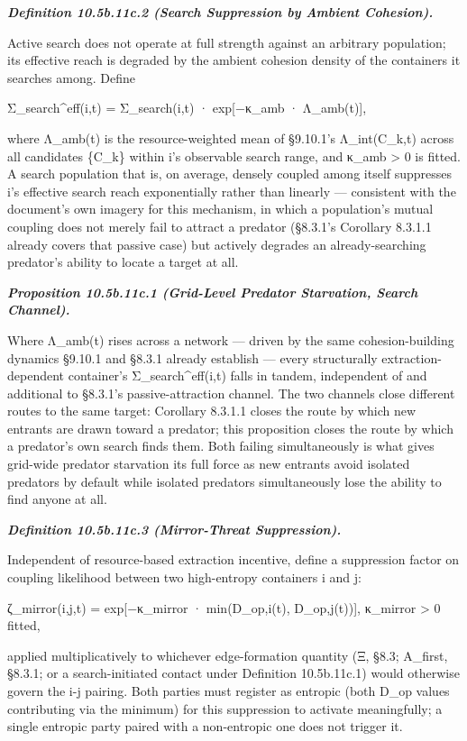 \documentclass[
]{article}
\begin{document}
\emph{\textbf{Definition 10.5b.11c.2 (Search Suppression by Ambient
Cohesion).}}

Active search does not operate at full strength against an arbitrary
population; its effective reach is degraded by the ambient cohesion
density of the containers it searches among. Define

Σ\_search\^{}eff(i,t) = Σ\_search(i,t) · exp{[}−κ\_amb · Λ\_amb(t){]},

where Λ\_amb(t) is the resource-weighted mean of §9.10.1's
Λ\_int(C\_k,t) across all candidates \{C\_k\} within i's observable
search range, and κ\_amb \textgreater{} 0 is fitted. A search population
that is, on average, densely coupled among itself suppresses i's
effective search reach exponentially rather than linearly --- consistent
with the document's own imagery for this mechanism, in which a
population's mutual coupling does not merely fail to attract a predator
(§8.3.1's Corollary 8.3.1.1 already covers that passive case) but
actively degrades an already-searching predator's ability to locate a
target at all.

\emph{\textbf{Proposition 10.5b.11c.1 (Grid-Level Predator Starvation,
Search Channel).}}

Where Λ\_amb(t) rises across a network --- driven by the same
cohesion-building dynamics §9.10.1 and §8.3.1 already establish ---
every structurally extraction-dependent container's
Σ\_search\^{}eff(i,t) falls in tandem, independent of and additional to
§8.3.1's passive-attraction channel. The two channels close different
routes to the same target: Corollary 8.3.1.1 closes the route by which
new entrants are drawn toward a predator; this proposition closes the
route by which a predator's own search finds them. Both failing
simultaneously is what gives grid-wide predator starvation its full
force as new entrants avoid isolated predators by default while isolated
predators simultaneously lose the ability to find anyone at all.

\emph{\textbf{Definition 10.5b.11c.3 (Mirror-Threat Suppression).}}

Independent of resource-based extraction incentive, define a suppression
factor on coupling likelihood between two high-entropy containers i and
j:

ζ\_mirror(i,j,t) = exp{[}−κ\_mirror · min(D\_op,i(t), D\_op,j(t)){]},
κ\_mirror \textgreater{} 0 fitted,

applied multiplicatively to whichever edge-formation quantity (Ξ, §8.3;
A\_first, §8.3.1; or a search-initiated contact under Definition
10.5b.11c.1) would otherwise govern the i-j pairing. Both parties must
register as entropic (both D\_op values contributing via the minimum)
for this suppression to activate meaningfully; a single entropic party
paired with a non-entropic one does not trigger it.
\end{document}
